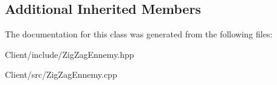 \subsection*{Additional Inherited Members}


The documentation for this class was generated from the following files\+:\begin{DoxyCompactItemize}
\item 
Client/include/Zig\+Zag\+Ennemy.\+hpp\item 
Client/src/Zig\+Zag\+Ennemy.\+cpp\end{DoxyCompactItemize}
